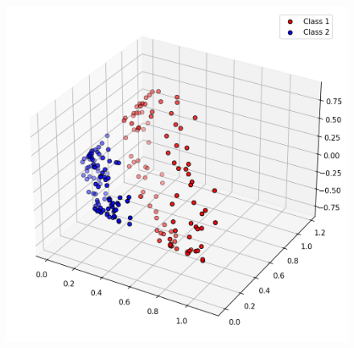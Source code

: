 \documentclass{beamer}
\begin{document}
\begin{frame}
\begin{itemize}
\begin{columns}
        \begin{figure}
          \includegraphics[width=1\textwidth]{images/circles3d.png}
        \end{figure}
      \end{columns}
    

  \end{itemize}
  
\end{frame}
\end{document}
